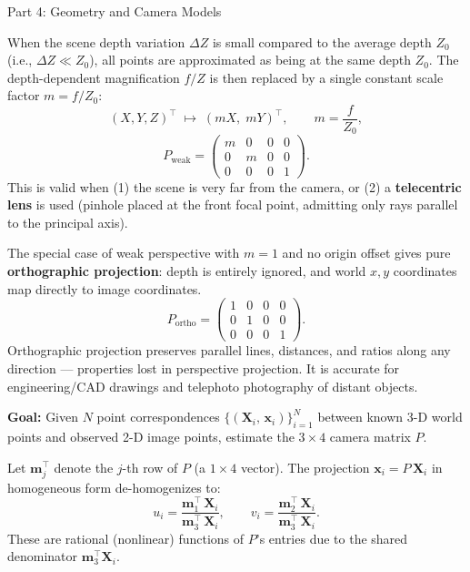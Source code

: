 \documentclass[letterpaper]{article}
\begin{document}
\begin{notes}{Part 4: Geometry and Camera Models}

When the scene depth variation $\Delta Z$ is small compared to the
average depth $Z_0$ (i.e., $\Delta Z \ll Z_0$), all points are
approximated as being at the same depth $Z_0$.  The depth-dependent
magnification $f/Z$ is then replaced by a single constant scale factor
$m = f/Z_0$:
\begin{equation}
  (X, Y, Z)^\top \;\longmapsto\; (mX,\; mY)^\top,
  \qquad m = \frac{f}{Z_0},
\end{equation}
\begin{equation}
  P_{\text{weak}} =
  \begin{pmatrix}
    m & 0 & 0 & 0 \\
    0 & m & 0 & 0 \\
    0 & 0 & 0 & 1
  \end{pmatrix}.
\end{equation}
This is valid when (1) the scene is very far from the camera, or (2) a
\textbf{telecentric lens} is used (pinhole placed at the front focal
point, admitting only rays parallel to the principal axis).


The special case of weak perspective with $m = 1$ and no origin offset
gives pure \textbf{orthographic projection}: depth is entirely ignored,
and world $x, y$ coordinates map directly to image coordinates.
\begin{equation}
  P_{\text{ortho}} =
  \begin{pmatrix}
    1 & 0 & 0 & 0 \\
    0 & 1 & 0 & 0 \\
    0 & 0 & 0 & 1
  \end{pmatrix}.
\end{equation}
Orthographic projection preserves parallel lines, distances, and ratios
along any direction --- properties lost in perspective projection.
It is accurate for engineering/CAD drawings and telephoto photography of
distant objects.


\textbf{Goal:} Given $N$ point correspondences
$\bigl\{(\mathbf{X}_i,\,\mathbf{x}_i)\bigr\}_{i=1}^{N}$ between known
3-D world points and observed 2-D image points, estimate the $3\times 4$
camera matrix $P$.


Let $\mathbf{m}_j^\top$ denote the $j$-th row of $P$ (a $1\times 4$
vector).  The projection $\mathbf{x}_i = P\,\mathbf{X}_i$ in homogeneous
form de-homogenizes to:
\begin{equation}
  u_i = \frac{\mathbf{m}_1^\top\,\mathbf{X}_i}{\mathbf{m}_3^\top\,\mathbf{X}_i},
  \qquad
  v_i = \frac{\mathbf{m}_2^\top\,\mathbf{X}_i}{\mathbf{m}_3^\top\,\mathbf{X}_i}.
  \label{eq:proj-het}
\end{equation}
These are rational (nonlinear) functions of $P$'s entries due to the
shared denominator $\mathbf{m}_3^\top\mathbf{X}_i$.


\end{notes}
\end{document}
